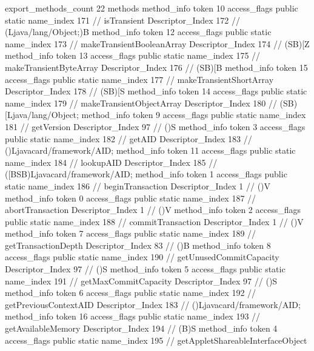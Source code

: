 {{{{{{{				}
				}
			}
			}
			export_methods_count	22
			methods {
				method_info {
					token	10
					access_flags	public static
					name_index	171		// isTransient
					Descriptor_Index	172		// (Ljava/lang/Object;)B
				}
				method_info {
					token	12
					access_flags	public static
					name_index	173		// makeTransientBooleanArray
					Descriptor_Index	174		// (SB)[Z
				}
				method_info {
					token	13
					access_flags	public static
					name_index	175		// makeTransientByteArray
					Descriptor_Index	176		// (SB)[B
				}
				method_info {
					token	15
					access_flags	public static
					name_index	177		// makeTransientShortArray
					Descriptor_Index	178		// (SB)[S
				}
				method_info {
					token	14
					access_flags	public static
					name_index	179		// makeTransientObjectArray
					Descriptor_Index	180		// (SB)[Ljava/lang/Object;
				}
				method_info {
					token	9
					access_flags	public static
					name_index	181		// getVersion
					Descriptor_Index	97		// ()S
				}
				method_info {
					token	3
					access_flags	public static
					name_index	182		// getAID
					Descriptor_Index	183		// ()Ljavacard/framework/AID;
				}
				method_info {
					token	11
					access_flags	public static
					name_index	184		// lookupAID
					Descriptor_Index	185		// ([BSB)Ljavacard/framework/AID;
				}
				method_info {
					token	1
					access_flags	public static
					name_index	186		// beginTransaction
					Descriptor_Index	1		// ()V
				}
				method_info {
					token	0
					access_flags	public static
					name_index	187		// abortTransaction
					Descriptor_Index	1		// ()V
				}
				method_info {
					token	2
					access_flags	public static
					name_index	188		// commitTransaction
					Descriptor_Index	1		// ()V
				}
				method_info {
					token	7
					access_flags	public static
					name_index	189		// getTransactionDepth
					Descriptor_Index	83		// ()B
				}
				method_info {
					token	8
					access_flags	public static
					name_index	190		// getUnusedCommitCapacity
					Descriptor_Index	97		// ()S
				}
				method_info {
					token	5
					access_flags	public static
					name_index	191		// getMaxCommitCapacity
					Descriptor_Index	97		// ()S
				}
				method_info {
					token	6
					access_flags	public static
					name_index	192		// getPreviousContextAID
					Descriptor_Index	183		// ()Ljavacard/framework/AID;
				}
				method_info {
					token	16
					access_flags	public static
					name_index	193		// getAvailableMemory
					Descriptor_Index	194		// (B)S
				}
				method_info {
					token	4
					access_flags	public static
					name_index	195		// getAppletShareableInterfaceObject
}}}}}
